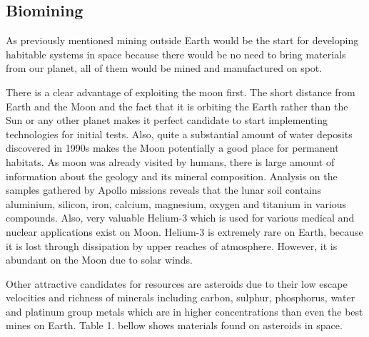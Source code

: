 \documentclass[12pt]{article}
\begin{document}
\subsection{Biomining}
As previously mentioned mining outside Earth would be the start for developing habitable systems in space because there would be no need to bring materials from our planet, all of them would be mined and manufactured on spot.

There is a clear advantage of exploiting the moon first. The short distance from Earth and the Moon and the fact that it is orbiting the Earth rather than the Sun or any other planet makes it perfect candidate to start implementing technologies for initial tests.\cite{} Also, quite a substantial amount of water deposits discovered in 1990s makes the Moon potentially a good place for
permanent habitats. As moon was already visited by humans, there is large amount of information about the geology and its mineral composition. Analysis on the samples gathered by Apollo missions reveals that the lunar soil contains aluminium, silicon, iron, calcium, magnesium, oxygen and titanium in various compounds.\cite{} Also, very valuable Helium-3 which is used for various medical and nuclear applications exist on Moon. Helium-3 is extremely rare on
Earth, because it is lost through dissipation by upper reaches of atmosphere. However, it is abundant on the Moon due to solar winds.

Other attractive candidates for resources are asteroids due to their low escape velocities and richness of minerals including carbon, sulphur, phosphorus, water and platinum group metals which are in higher concentrations than even the best mines on Earth. Table 1. bellow shows materials found on asteroids in space.

\end{document}
